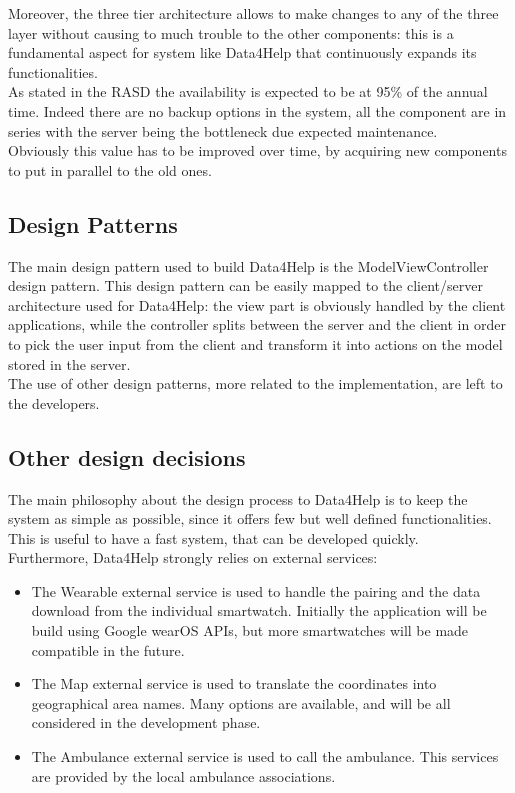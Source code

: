 Moreover, the three tier architecture allows to make changes to any of the three layer without causing to much trouble to the other components: this is a fundamental aspect for system like Data4Help that continuously expands its functionalities.
\\

As stated in the RASD the availability is expected to be at 95\% of the annual time. Indeed there are no backup options in the system, all the component are in series with the server being the bottleneck due expected maintenance.\\
Obviously this value has to be improved over time, by acquiring new components to put in parallel to the old ones.

\subsection{Design Patterns}
The main design pattern used to build Data4Help is the ModelViewController design pattern.
This design pattern can be easily mapped to the client/server architecture used for Data4Help: the 
view part is obviously handled by the client applications, while the controller splits between the server and the client in order to pick the user input from the client and transform it into actions on the model stored in the server.
\\
The use of other design patterns, more related to the implementation, are left to the developers. 

\subsection{Other design decisions}
The main philosophy about the design process to Data4Help is to keep the system as simple as possible, since it offers few but well defined functionalities. This is useful to have a fast system, that can be developed quickly.\\
Furthermore, Data4Help strongly relies on external services:
\begin{itemize}
\item The Wearable external service is used to handle the pairing and the data download from the individual smartwatch. Initially the application will be build using Google wearOS APIs, but more smartwatches will be made compatible in the future.
\item The Map external service is used to translate the coordinates into geographical area names. Many options are available, and will be all considered in the development phase.
\item The Ambulance external service is used to call the ambulance. This services are provided by the local ambulance associations.
\end{itemize}


